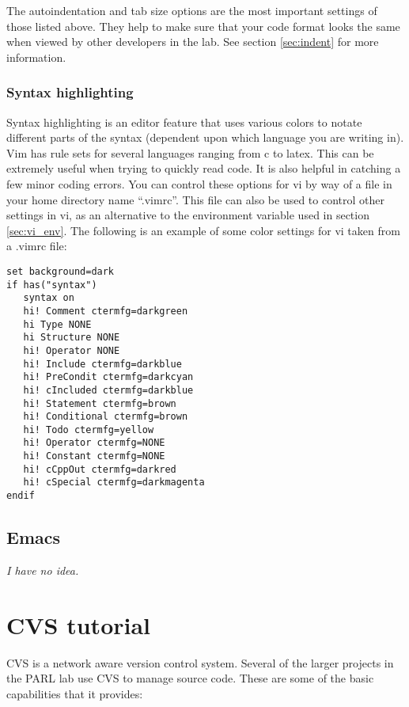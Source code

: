 \documentclass[11pt, letterpaper]{article}
\begin{document}
The autoindentation and tab size options are the most important settings
of those listed above.  They help to make sure that your code format looks the
same when viewed by other developers in the lab.  See section
\ref{sec:indent} for more information.

\subsubsection{Syntax highlighting}

Syntax highlighting is an editor feature that uses various colors to
notate different parts of the syntax (dependent upon which language you
are writing in).  Vim has rule sets for several languages ranging from c
to latex.  This can be extremely useful when trying to quickly
read code.  It is also helpful in catching a few minor coding errors.
You can control these options for vi by way of a file in your home directory name
``.vimrc''.  This file can also be used to control other settings in vi,
as an alternative to the environment variable used in section \ref{sec:vi_env}.  The following is an example
of some color settings for vi taken from a .vimrc file:

\begin{verbatim}
set background=dark
if has("syntax")
   syntax on
   hi! Comment ctermfg=darkgreen
   hi Type NONE
   hi Structure NONE
   hi! Operator NONE
   hi! Include ctermfg=darkblue
   hi! PreCondit ctermfg=darkcyan
   hi! cIncluded ctermfg=darkblue
   hi! Statement ctermfg=brown
   hi! Conditional ctermfg=brown
   hi! Todo ctermfg=yellow
   hi! Operator ctermfg=NONE
   hi! Constant ctermfg=NONE
   hi! cCppOut ctermfg=darkred
   hi! cSpecial ctermfg=darkmagenta
endif
\end{verbatim}

\subsection{Emacs}

\emph{I have no idea.}



\section{CVS tutorial}

CVS is a network aware version control system.  Several of the larger
projects in the PARL lab use CVS to manage source code.  These are some of the
basic capabilities that it provides:
\end{document}
